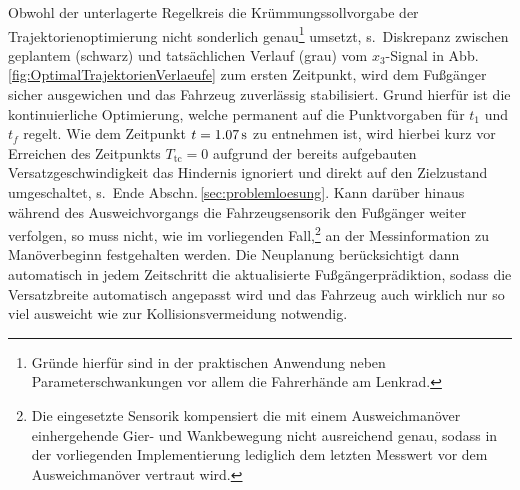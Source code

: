 Obwohl der unterlagerte Regelkreis die Krümmungssollvorgabe der Trajektorienoptimierung nicht sonderlich genau\footnote{Gründe hierfür sind in der praktischen Anwendung neben Parameterschwankungen vor allem die Fahrerhände am Lenkrad.} umsetzt, s.\ Diskrepanz zwischen geplantem (schwarz) und tatsächlichen Verlauf (grau) vom  $x_3$-Signal in Abb.\,\ref{fig:OptimalTrajektorienVerlaeufe} zum ersten Zeitpunkt, wird dem Fußgänger sicher ausgewichen und das Fahrzeug zuverlässig stabilisiert. Grund hierfür ist die kontinuierliche Optimierung, welche permanent auf die Punktvorgaben für $t_1$ und $t_f$ regelt. Wie dem Zeitpunkt $t=\unit[1.07]{s}$ zu entnehmen ist, wird hierbei kurz vor Erreichen des Zeitpunkts $T_\text{tc}=0$ aufgrund der bereits aufgebauten Versatzgeschwindigkeit das Hindernis ignoriert und direkt auf den Zielzustand umgeschaltet, s.\ Ende Abschn.\,\ref{sec:problemloesung}. Kann darüber hinaus während des Ausweichvorgangs die Fahrzeugsensorik den Fußgänger weiter verfolgen, so muss nicht, wie im vorliegenden Fall,\footnote{Die eingesetzte Sensorik kompensiert die mit einem Ausweichmanöver einhergehende Gier- und Wankbewegung nicht ausreichend genau, sodass in der vorliegenden Implementierung lediglich dem letzten Messwert vor dem Ausweichmanöver vertraut wird.} an der Messinformation zu Manöverbeginn festgehalten werden. Die Neuplanung berücksichtigt dann automatisch in jedem Zeitschritt die aktualisierte Fußgängerprädiktion, sodass die Versatzbreite automatisch angepasst wird und das Fahrzeug auch wirklich nur so viel ausweicht wie zur Kollisionsvermeidung notwendig.
\\


